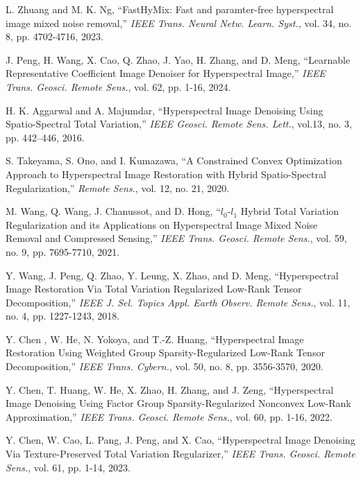 \begin{thebibliography}{100}
	 L. Zhuang and M. K. Ng, ``FastHyMix: Fast and paramter-free hyperspectral image mixed noise removal,'' \textit{IEEE Trans. Neural Netw. Learn. Syst.,} vol. 34, no. 8, pp. 4702-4716, 2023.
	
	 J. Peng, H. Wang, X. Cao, Q. Zhao, J. Yao, H. Zhang, and D. Meng, ``Learnable Representative Coefficient Image Denoiser for Hyperspectral Image,'' \textit{IEEE Trans. Geosci. Remote Sens.}, vol. 62, pp. 1-16, 2024.
	
	 H. K. Aggarwal and A. Majumdar, ``Hyperspectral Image Denoising Using Spatio-Spectral Total Variation,'' \textit{IEEE Geosci. Remote Sens. Lett.}, vol.13, no. 3, pp. 442--446, 2016.
	
	 S. Takeyama, S. Ono, and I. Kumazawa, ``A Constrained Convex Optimization Approach to Hyperspectral Image Restoration with Hybrid Spatio-Spectral Regularization,'' \textit{Remote Sens.}, vol. 12, no. 21, 2020.
	
	 M. Wang, Q. Wang, J. Chanussot, and D. Hong, ``$l_0$-$l_1$ Hybrid Total Variation Regularization and its Applications on Hyperspectral Image Mixed Noise Removal and Compressed Sensing,'' \textit{IEEE Trans. Geosci. Remote Sens.}, vol. 59, no. 9, pp. 7695-7710, 2021. 
	
	 Y. Wang, J. Peng, Q. Zhao, Y. Leung, X. Zhao, and D. Meng, ``Hyperspectral Image Restoration Via Total Variation Regularized Low-Rank Tensor Decomposition,'' \textit{IEEE J. Sel. Topics Appl. Earth Observ. Remote Sens.}, vol. 11, no. 4, pp. 1227-1243, 2018.
	
	 Y. Chen , W. He, N. Yokoya, and T.-Z. Huang, ``Hyperspectral Image Restoration Using Weighted Group Sparsity-Regularized Low-Rank Tensor Decomposition,'' \textit{IEEE Trans. Cybern.}, vol. 50, no. 8, pp. 3556-3570, 2020.
	
	 Y. Chen, T. Huang, W. He, X. Zhao, H. Zhang, and J. Zeng, ``Hyperspectral Image Denoising Using Factor Group Sparsity-Regularized Nonconvex Low-Rank Approximation,'' \textit{IEEE Trans. Geosci. Remote Sens.}, vol. 60, pp. 1-16, 2022.
	
	 Y. Chen, W. Cao, L. Pang, J. Peng, and X. Cao, ``Hyperspectral Image Denoising Via Texture-Preserved Total Variation Regularizer,'' \textit{IEEE Trans. Geosci. Remote Sens.}, vol. 61, pp. 1-14, 2023.	
	

\end{thebibliography}
